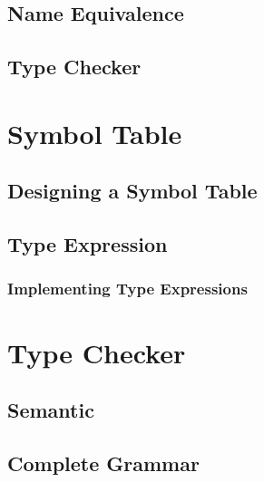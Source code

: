 \subsection{Name Equivalence}

\subsection{Type Checker}


\section{Symbol Table}

\subsection{Designing a Symbol Table}

\subsection{Type Expression}

\subsubsection{Implementing Type Expressions}

\section{Type Checker}
\subsection{Semantic}

\subsection{Complete Grammar}

